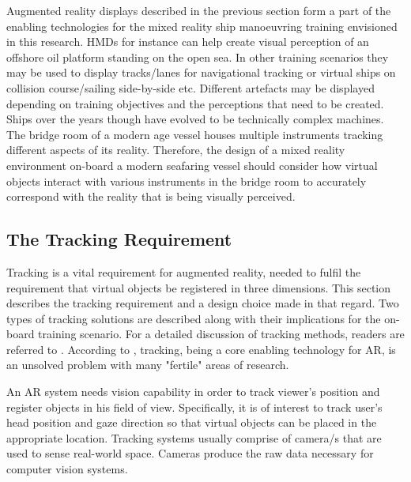 Augmented reality displays described in the previous section form a part of the enabling technologies for the mixed reality ship manoeuvring training envisioned in this research. HMDs for instance can help create visual perception of an offshore oil platform standing on the open sea. In other training scenarios they may be used to display tracks/lanes for navigational tracking or virtual ships on collision course/sailing side-by-side etc. Different artefacts may be displayed depending on training objectives and the perceptions that need to be created. Ships over the years though have evolved to be technically complex machines. The bridge room of a modern age vessel houses multiple instruments tracking different aspects of its reality. Therefore, the design of a mixed reality environment on-board a modern seafaring vessel should consider how virtual objects interact with various instruments in the bridge room to accurately correspond with the reality that is being visually perceived.  
%
%

\subsection{The Tracking Requirement}
Tracking is a vital requirement for augmented reality, needed to fulfil the requirement that virtual objects be registered in three dimensions. This section describes the tracking requirement and a design choice made in that regard. Two types of tracking solutions are described along with their implications for the on-board training scenario. For a detailed discussion of tracking methods, readers are referred to \cite{zhou2008trends}. According to \cite{zhou2008trends}, tracking, being a core enabling technology for AR, is an unsolved problem with many "fertile" areas of research.

An AR system needs vision capability in order to track viewer’s position and register objects in his field of view. Specifically, it is of interest to track user's head position and gaze direction so that virtual objects can be placed in the appropriate location. Tracking systems usually comprise of camera/s that are used to sense real-world space. Cameras produce the raw data necessary for computer vision systems.   

